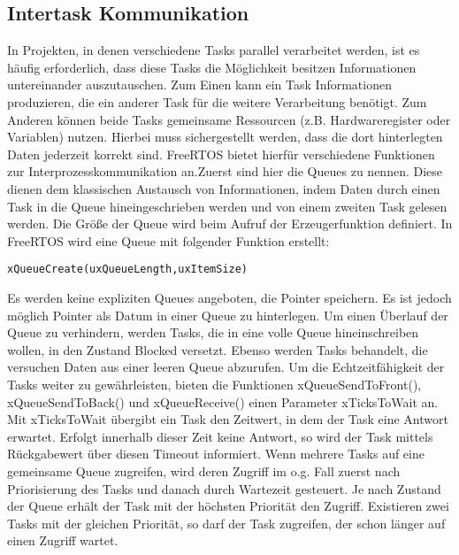 \subsection{Intertask Kommunikation}
In Projekten, in denen verschiedene Tasks parallel verarbeitet werden, ist es häufig erforderlich, dass diese Tasks die Möglichkeit besitzen Informationen untereinander auszutauschen. Zum Einen kann ein Task Informationen produzieren, die ein anderer Task für die weitere Verarbeitung benötigt. Zum Anderen können beide Tasks gemeinsame Ressourcen (z.B. Hardwareregister oder Variablen) nutzen. Hierbei muss sichergestellt werden, dass die dort hinterlegten Daten jederzeit korrekt sind. FreeRTOS bietet hierfür verschiedene Funktionen zur Interprozesskommunikation an.\newline Zuerst sind hier die Queues zu nennen. Diese dienen dem klassischen Austausch von Informationen, indem Daten durch einen Task in die Queue hineingeschrieben werden und von einem zweiten Task gelesen werden. Die Größe der Queue wird beim Aufruf der Erzeugerfunktion definiert. In FreeRTOS wird eine Queue mit folgender Funktion erstellt: 
\begin{lstlisting}[numbers = none]
xQueueCreate(uxQueueLength,uxItemSize)
\end{lstlisting}
Es werden keine expliziten Queues angeboten, die Pointer speichern. Es ist jedoch möglich Pointer als Datum in einer Queue zu hinterlegen. Um einen Überlauf der Queue zu verhindern, werden Tasks, die in eine volle Queue hineinschreiben wollen, in den Zustand Blocked versetzt. Ebenso werden Tasks behandelt, die versuchen Daten aus einer leeren Queue abzurufen. Um die Echtzeitfähigkeit der Tasks weiter zu gewährleisten, bieten die Funktionen xQueueSendToFront(), xQueueSendToBack() und xQueueReceive() einen Parameter xTicksToWait an. Mit xTicksToWait übergibt ein Task den Zeitwert, in dem der Task eine Antwort erwartet. Erfolgt innerhalb dieser Zeit keine Antwort, so wird der Task mittels Rückgabewert über diesen Timeout informiert.
Wenn mehrere Tasks auf eine gemeinsame Queue zugreifen, wird deren Zugriff im o.g. Fall zuerst nach Priorisierung des Tasks und danach durch Wartezeit gesteuert. Je nach Zustand der Queue erhält der Task mit der höchsten Priorität den Zugriff. Existieren zwei Tasks mit der gleichen Priorität, so darf der Task zugreifen, der schon länger auf einen Zugriff wartet.\newline
